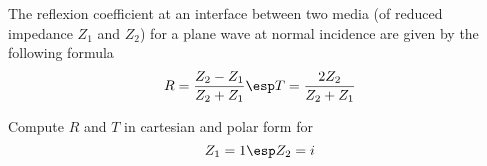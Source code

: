 \bexo
The reflexion coefficient at an interface between two media (of reduced impedance $Z_1$ and $Z_2$) for a plane wave at normal incidence are given by the following formula
\begin{equation*}
R=\dfrac{Z_2-Z_1}{Z_2+Z_1}\esp 
T=\dfrac{2Z_2}{Z_2+Z_1}
\end{equation*}

Compute $R$ and $T$ in cartesian and polar form for 
\begin{equation}
Z_1=1\esp 
Z_2=i
\end{equation}
\eexo




